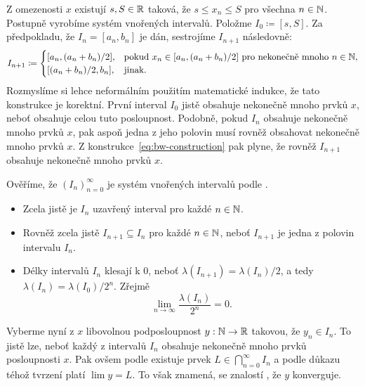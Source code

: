 \begin{thmproof}
 Z omezenosti $x$ existují $s,S \in \mathbb{R}$ taková, že $s \leq x_n \leq S$ pro
 všechna $n \in \mathbb{N}$. Postupně vyrobíme systém vnořených intervalů. Položme $I_0
 \coloneqq [s,S]$. Za předpokladu, že $I_n = [a_n,b_n]$ je dán, sestrojíme
 $I_{n+1}$ následovně:
 \begin{equation}
  \label{eq:bw-construction}
  I_{n+1} \coloneqq \begin{cases}
   [a_n, (a_n+b_n) / 2], &\text{pokud } x_n \in [a_n, (a_n+b_n) / 2] \text{ pro
   nekonečně mnoho } n \in \mathbb{N},\\
    [ (a_n+b_n) / 2,b_n ], &\text{jinak}.
  \end{cases}
 \end{equation}
 Rozmyslíme si lehce neformálním použitím matematické indukce, že tato
 konstrukce je korektní. První interval $I_0$ jistě obsahuje nekonečně mnoho
 prvků $x$, neboť obsahuje celou tuto posloupnost. Podobně, pokud $I_n$ obsahuje
 nekonečně mnoho prvků $x$, pak aspoň jedna z jeho polovin musí rovněž obsahovat
 nekonečně mnoho prvků $x$. Z konstrukce~\eqref{eq:bw-construction} pak plyne,
 že rovněž $I_{n+1}$ obsahuje nekonečně mnoho prvků $x$.

 Ověříme, že $(I_n)_{n=0}^{\infty}$ je systém vnořených intervalů podle
 .
 \begin{itemize}
  \item Zcela jistě je $I_n$ uzavřený interval pro každé $n \in \mathbb{N}$.
  \item Rovněž zcela jistě $I_{n+1} \subseteq I_n$ pro každé $n \in \mathbb{N}$, neboť
   $I_{n+1}$ je jedna z polovin intervalu $I_n$.
  \item Délky intervalů $I_n$ klesají k $0$, neboť $\lambda(I_{n+1}) =
   \lambda(I_n) / 2$, a tedy $\lambda(I_n) = \lambda(I_0) / 2^{n}$. Zřejmě
   \[
    \lim_{n \to \infty} \frac{\lambda(I_n)}{2^{n}} = 0.
   \]
 \end{itemize}
 Vyberme nyní z $x$ libovolnou podposloupnost $y:\mathbb{N} \to \mathbb{R}$ takovou, že $y_n \in
 I_n$. To jistě lze, neboť každý z intervalů $I_n$ obsahuje nekonečně mnoho
 prvků posloupnosti $x$. Pak ovšem podle 
 existuje prvek $L \in \bigcap_{n=0}^{\infty} I_n$ a podle důkazu téhož tvrzení
 platí $\lim y = L$. To však znamená, se znalostí
 , že $y$ konverguje.
\end{thmproof}
